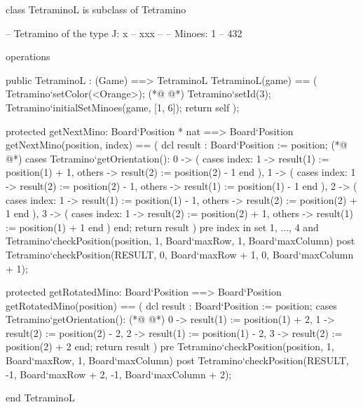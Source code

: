 \begin{vdmpp}[breaklines=true]
class TetraminoL is subclass of Tetramino
  
 -- Tetramino of the type J: x
 --       xxx
 --
 -- Minoes:         1
 --        432


 operations
 
  public TetraminoL : (Game) ==> TetraminoL
  TetraminoL(game) == (
   Tetramino`setColor(<Orange>);
(*@
\label{TetraminoL:15}
@*)
   Tetramino`setId(3);
   Tetramino`initialSetMinoes(game, [1, 6]);
   return self
  );

  protected getNextMino: Board`Position * nat ==> Board`Position
  getNextMino(position, index) == (
   dcl result : Board`Position := position;
(*@
\label{getNextMino:23}
@*)
   cases Tetramino`getOrientation():
    0 -> (
     cases index:
      1 -> result(1) := position(1) + 1,
      others -> result(2) := position(2) - 1
     end
    ),
    1 -> (
     cases index:
      1 -> result(2) := position(2) - 1,
      others -> result(1) := position(1) - 1
     end
    ),
    2 -> (
     cases index:
      1 -> result(1) := position(1) - 1,
      others -> result(2) := position(2) + 1
     end
    ),
    3 -> (
     cases index:
      1 -> result(2) := position(2) + 1,
      others -> result(1) := position(1) + 1
     end
    )
   end;
   return result
  )
  pre index in set {1, ..., 4} 
   and Tetramino`checkPosition(position, 1, Board`maxRow, 1, Board`maxColumn)
  post Tetramino`checkPosition(RESULT, 0, Board`maxRow + 1, 0, Board`maxColumn + 1);
   
  protected getRotatedMino: Board`Position ==> Board`Position
  getRotatedMino(position) == (
   dcl result : Board`Position := position;
   cases Tetramino`getOrientation():
(*@
\label{getRotatedMino:59}
@*)
    0 -> result(1) := position(1) + 2,
    1 -> result(2) := position(2) - 2,
    2 -> result(1) := position(1) - 2,
    3 -> result(2) := position(2) + 2
   end;
   return result
  )
  pre Tetramino`checkPosition(position, 1, Board`maxRow, 1, Board`maxColumn)
  post Tetramino`checkPosition(RESULT, -1, Board`maxRow + 2, -1, Board`maxColumn + 2); 

end TetraminoL
\end{vdmpp}
